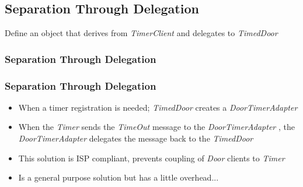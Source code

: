 \documentclass{beamer}
\begin{document}
\subsection{Separation Through Delegation}
\begin{frame}
  Define an object that derives from \textit{TimerClient} and delegates to \textit{TimedDoor} \\
  \frametitle{Separation Through Delegation}
  \begin{center}
	\end{center}
\end{frame}

\begin{frame}
  \frametitle{Separation Through Delegation}
  \begin{itemize}
	\item<+-> When a timer registration is needed; \textit{TimedDoor} creates a \textit{DoorTimerAdapter}
	\item<+-> When the \textit{Timer} sends the \textit{TimeOut} message to the \textit{DoorTimerAdapter} , the \textit{DoorTimerAdapter} delegates the message back to the \textit{TimedDoor}
	\item<+-> This solution is ISP compliant, prevents coupling of \textit{Door} clients to \textit{Timer}
	\item<+-> Is a general purpose solution but has a little overhead...
   \end{itemize}
\end{frame}
\end{document}
